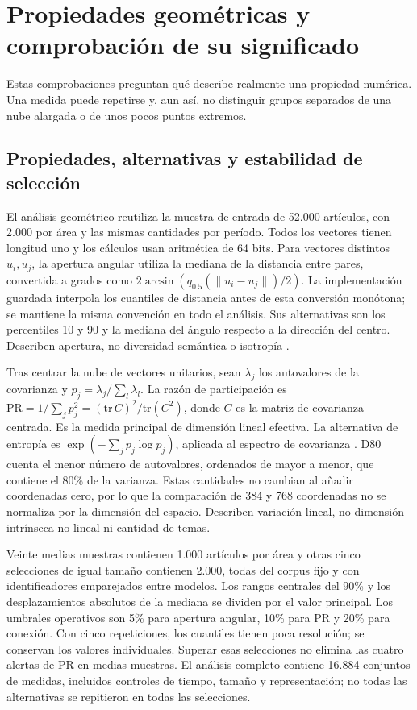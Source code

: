 \documentclass[12pt]{article}
\begin{document}
\section{Propiedades geométricas y comprobación de su significado}
Estas comprobaciones preguntan qué describe realmente una propiedad numérica. Una medida puede repetirse y, aun así, no distinguir grupos separados de una nube alargada o de unos pocos puntos extremos.

\subsection{Propiedades, alternativas y estabilidad de selección}
El análisis geométrico reutiliza la muestra de entrada de 52.000 artículos, con 2.000 por área y las mismas cantidades por período. Todos los vectores tienen longitud uno y los cálculos usan aritmética de 64 bits. Para vectores distintos $u_i,u_j$, la apertura angular utiliza la mediana de la distancia entre pares, convertida a grados como $2\arcsin(q_{0.5}(\lVert u_i-u_j\rVert)/2)$. La implementación guardada interpola los cuantiles de distancia antes de esta conversión monótona; se mantiene la misma convención en todo el análisis. Sus alternativas son los percentiles 10 y 90 y la mediana del ángulo respecto a la dirección del centro. Describen apertura, no diversidad semántica o isotropía \citep{rudman-etal-2022-isoscore}.

Tras centrar la nube de vectores unitarios, sean $\lambda_j$ los autovalores de la covarianza y $p_j=\lambda_j/\sum_l\lambda_l$. La razón de participación es $\mathrm{PR}=1/\sum_j p_j^2=(\mathrm{tr}\,C)^2/\mathrm{tr}(C^2)$, donde $C$ es la matriz de covarianza centrada. Es la medida principal de dimensión lineal efectiva. La alternativa de entropía es $\exp(-\sum_j p_j\log p_j)$, aplicada al espectro de covarianza \citep{roy_2007_40328}. D80 cuenta el menor número de autovalores, ordenados de mayor a menor, que contiene el 80\% de la varianza. Estas cantidades no cambian al añadir coordenadas cero, por lo que la comparación de 384 y 768 coordenadas no se normaliza por la dimensión del espacio. Describen variación lineal, no dimensión intrínseca no lineal ni cantidad de temas.

Veinte medias muestras contienen 1.000 artículos por área y otras cinco selecciones de igual tamaño contienen 2.000, todas del corpus fijo y con identificadores emparejados entre modelos. Los rangos centrales del 90\% y los desplazamientos absolutos de la mediana se dividen por el valor principal. Los umbrales operativos son 5\% para apertura angular, 10\% para PR y 20\% para conexión. Con cinco repeticiones, los cuantiles tienen poca resolución; se conservan los valores individuales. Superar esas selecciones no elimina las cuatro alertas de PR en medias muestras. El análisis completo contiene 16.884 conjuntos de medidas, incluidos controles de tiempo, tamaño y representación; no todas las alternativas se repitieron en todas las selecciones.

\FloatBarrier
\clearpage
\end{document}
